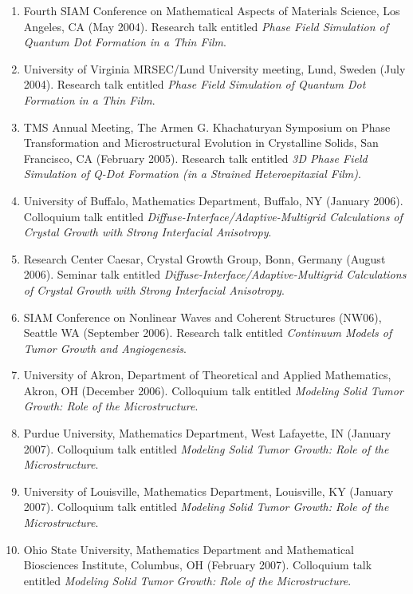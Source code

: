 \documentclass[11pt]{letter}
\begin{document}
    \begin{enumerate}
    \item
Fourth SIAM Conference on Mathematical Aspects of Materials Science, Los Angeles, CA (May 2004). Research talk entitled {\sl Phase Field Simulation of Quantum Dot Formation in a Thin Film}.
    \item
University of Virginia MRSEC/Lund University meeting, Lund, Sweden (July 2004). Research talk entitled {\sl Phase Field Simulation of Quantum Dot Formation in a Thin Film}.
    \item
TMS Annual Meeting, The Armen G. Khachaturyan Symposium on Phase Transformation and Microstructural Evolution in Crystalline Solids, San Francisco, CA (February 2005).  Research talk entitled {\sl 3D Phase Field Simulation of Q-Dot Formation (in a Strained Heteroepitaxial Film)}.
    \item
University of Buffalo, Mathematics Department, Buffalo, NY (January 2006).  Colloquium talk entitled {\sl Diffuse-Interface/Adaptive-Multigrid Calculations of Crystal Growth with Strong Interfacial Anisotropy}.
    \item
Research Center Caesar, Crystal Growth Group, Bonn, Germany (August 2006).  Seminar talk entitled {\sl Diffuse-Interface/Adaptive-Multigrid Calculations of Crystal Growth with Strong Interfacial Anisotropy}.
    \item
SIAM Conference on Nonlinear Waves and Coherent Structures (NW06), Seattle WA (September 2006).  Research talk entitled {\sl Continuum Models of Tumor Growth and Angiogenesis}.
    \item
University of Akron, Department of Theoretical and Applied Mathematics, Akron, OH (December 2006).  Colloquium talk entitled {\sl Modeling Solid Tumor Growth: Role of the Microstructure}.
    \item
Purdue University, Mathematics Department, West Lafayette, IN (January 2007).  Colloquium talk entitled {\sl Modeling Solid Tumor Growth: Role of the Microstructure}.
    \item
University of Louisville, Mathematics Department, Louisville, KY (January 2007).  Colloquium talk entitled {\sl Modeling Solid Tumor Growth: Role of the Microstructure}.
    \item
Ohio State University, Mathematics Department and Mathematical Biosciences Institute, Columbus, OH (February 2007).  Colloquium talk entitled {\sl Modeling Solid Tumor Growth: Role of the Microstructure}.

\end{enumerate}
\end{document}
